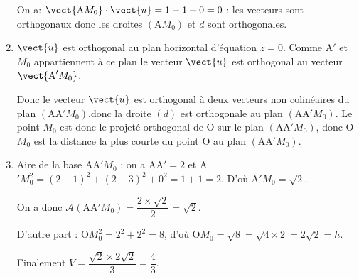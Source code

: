 \begin{enumerate}
On a: $\vect{\text{A}M_0} \cdot \vect{u} = 1 - 1 + 0 = 0$ : les vecteurs sont orthogonaux donc les droites $\left(\text{A}M_0\right)$ et $d$ sont orthogonales.
\item %

$\vect{u}$ est orthogonal au plan horizontal d'équation $z = 0$. Comme A$'$ et $M_0$ appartiennent à ce plan le vecteur $\vect{u}$ est orthogonal au vecteur $\vect{\text{A}'M_0}$.

Donc le vecteur $\vect{u}$ est orthogonal à deux vecteurs non colinéaires du plan $\left(\text{AA}'M_0\right)$,donc la droite $(d)$ est orthogonale au plan 
$\left(\text{AA}'M_0\right)$. Le point $M_0$ est donc le projeté orthogonal de O sur le plan $\left(\text{AA}'M_0\right)$, donc O$M_0$ est la distance la plus courte du point O au plan $\left(\text{AA}'M_0\right)$.

\item %


Aire de la base AA$'M_0$ : on a AA$' = 2$ et A$'M_0^2 = (2 - 1)^2 + (2 - 3)^2 + 0^2 = 1 + 1 = 2$. D'où A$'M_0 = \sqrt{2}$.

On a donc $\mathcal{A}\left(\text{AA}'M_0\right) = \dfrac{2 \times \sqrt{2}}{2} = \sqrt{2}$.

D'autre part : O$M_0^2 = 2^2 + 2^2 = 8$, d'où O$M_0 = \sqrt{8} = \sqrt{4 \times 2} = 2\sqrt{2} = h$.

Finalement $V  = \dfrac{\sqrt{2} \times 2\sqrt{2}}{3} = \dfrac{4}{3}$.
\end{enumerate}

\vspace{0.75cm}

